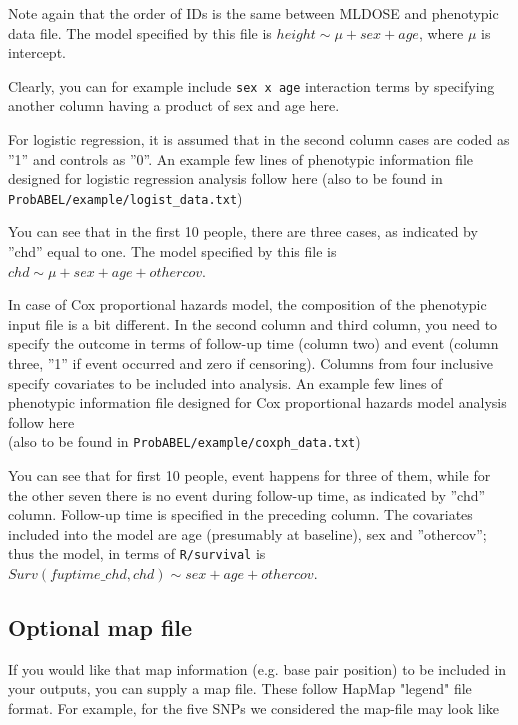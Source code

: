 \documentclass[12pt]{article}
\begin{document}


Note again that the order of IDs is the same between MLDOSE and phenotypic 
data file. The model specified by this file is $height \sim \mu + sex + age$, 
where $\mu$ is intercept.  

Clearly, you can for example include \texttt{sex x age} interaction terms by 
specifying another column having a product of sex and age here.

For logistic regression, it is assumed that in the second column cases are 
coded as ''1'' and controls as ''0''. An example few lines of phenotypic 
information file designed for logistic regression analysis follow here (also 
to be found in \texttt{ProbABEL/example/logist\_data.txt})



You can see that in the first 10 people, there are three cases, as indicated 
by ''chd'' equal to one. The model specified by this file 
is $chd \sim \mu + sex + age + othercov$.  

In case of Cox proportional hazards model, the composition of the 
phenotypic input file is a bit different. In the second column and 
third column, you need to specify the outcome in terms of follow-up 
time (column two) and event (column three, ''1'' if event occurred 
and zero if censoring). Columns from four inclusive specify covariates 
to be included into analysis. An example few lines of phenotypic 
information file designed for Cox proportional hazards model 
analysis follow here \\(also to be found in
\texttt{ProbABEL/example/coxph\_data.txt})



You can see that for first 10 people, event happens for three of 
them, while for the other seven there is no event during follow-up 
time, as indicated 
by ''chd'' column. Follow-up time is specified in the preceding 
column. The covariates included into the model are age (presumably 
at baseline), sex and ''othercov''; thus the model, in terms of 
\texttt{R/survival} is \\ $Surv(fuptime\_chd, chd) \sim sex + age + othercov$.  

\subsection{Optional map file}
If you would like that map information (e.g. base pair position) to 
be included in your outputs, you can supply a map file. These follow 
HapMap "legend" file format. For example, for the five SNPs we considered 
the map-file may look like
\end{document}
